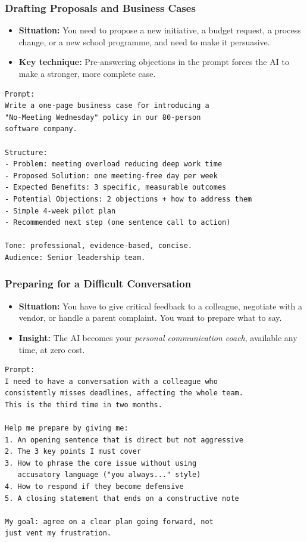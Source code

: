 \begin{frame}[fragile]\frametitle{Drafting Proposals and Business Cases}

    \begin{itemize}
        \item \textbf{Situation:} You need to propose a new initiative, a budget request, a process change, or a new school programme, and need to make it persuasive.
        \item \textbf{Key technique:} Pre-answering objections in the prompt forces the AI to make a stronger, more complete case.
    \end{itemize}
		
\begin{lstlisting}[language=HTML]
Prompt:
Write a one-page business case for introducing a 
"No-Meeting Wednesday" policy in our 80-person 
software company.

Structure:
- Problem: meeting overload reducing deep work time
- Proposed Solution: one meeting-free day per week
- Expected Benefits: 3 specific, measurable outcomes
- Potential Objections: 2 objections + how to address them
- Simple 4-week pilot plan
- Recommended next step (one sentence call to action)

Tone: professional, evidence-based, concise.
Audience: Senior leadership team.
\end{lstlisting}



\end{frame}


\begin{frame}[fragile]\frametitle{Preparing for a Difficult Conversation}

    \begin{itemize}
        \item \textbf{Situation:} You have to give critical feedback to a colleague, negotiate with a vendor, or handle a parent complaint. You want to prepare what to say.
        \item \textbf{Insight:} The AI becomes your \emph{personal communication coach}, available any time, at zero cost.
    \end{itemize}

		
\begin{lstlisting}[language=HTML]
Prompt:
I need to have a conversation with a colleague who 
consistently misses deadlines, affecting the whole team.
This is the third time in two months.

Help me prepare by giving me:
1. An opening sentence that is direct but not aggressive
2. The 3 key points I must cover
3. How to phrase the core issue without using 
   accusatory language ("you always..." style)
4. How to respond if they become defensive
5. A closing statement that ends on a constructive note

My goal: agree on a clear plan going forward, not 
just vent my frustration.
\end{lstlisting}


\end{frame}


